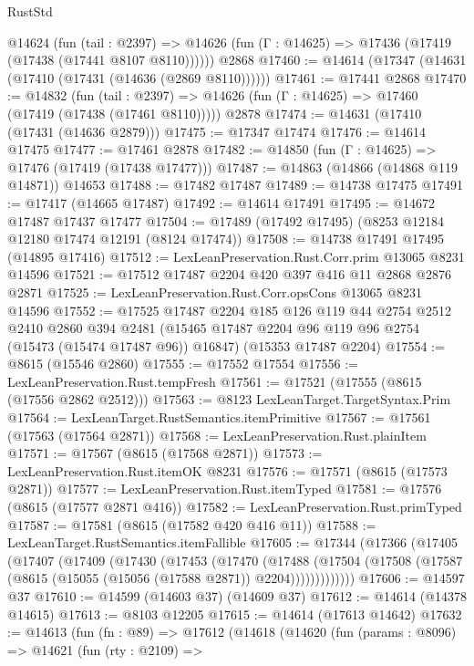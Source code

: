 \begin{lexlean}{RustStd}
\begin{coremodule}
    @14624
      (fun (tail : @2397) =>
      @14626 (fun (Γ : @14625) => @17436 (@17419 (@17438 (@17441 @8107 @8110))))))
    @2868
@17460 := @14614 (@17347 (@14631 (@17410 (@17431 (@14636 (@2869 @8110))))))
@17461 := @17441 @2868
@17470 := @14832
    (fun (tail : @2397) => @14626 (fun (Γ : @14625) => @17460 (@17419 (@17438 (@17461 @8110)))))
    @2878
@17474 := @14631 (@17410 (@17431 (@14636 @2879)))
@17475 := @17347 @17474
@17476 := @14614 @17475
@17477 := @17461 @2878
@17482 := @14850 (fun (Γ : @14625) => @17476 (@17419 (@17438 @17477)))
@17487 := @14863 (@14866 (@14868 @119 @14871)) @14653
@17488 := @17482 @17487
@17489 := @14738 @17475
@17491 := @17417 (@14665 @17487)
@17492 := @14614 @17491
@17495 := @14672 @17487 @17437 @17477
@17504 := @17489 (@17492 @17495) (@8253 @12184 @12180 @17474 @12191 (@8124 @17474))
@17508 := @14738 @17491 @17495 (@14895 @17416)
@17512 := LexLeanPreservation.Rust.Corr.prim @13065 @8231 @14596
@17521 := @17512 @17487 @2204 @420 @397 @416 @11 @2868 @2876 @2871
@17525 := LexLeanPreservation.Rust.Corr.opsCons @13065 @8231 @14596
@17552 := @17525
    @17487
    @2204
    @185
    @126
    @119
    @44
    @2754
    @2512
    @2410
    @2860
    @394
    @2481
    (@15465 @17487 @2204 @96 @119 @96 @2754 (@15473 (@15474 @17487 @96)) @16847)
    (@15353 @17487 @2204)
@17554 := @8615 (@15546 @2860)
@17555 := @17552 @17554
@17556 := LexLeanPreservation.Rust.tempFresh
@17561 := @17521 (@17555 (@8615 (@17556 @2862 @2512)))
@17563 := @8123 LexLeanTarget.TargetSyntax.Prim
@17564 := LexLeanTarget.RustSemantics.itemPrimitive
@17567 := @17561 (@17563 (@17564 @2871))
@17568 := LexLeanPreservation.Rust.plainItem
@17571 := @17567 (@8615 (@17568 @2871))
@17573 := LexLeanPreservation.Rust.itemOK @8231
@17576 := @17571 (@8615 (@17573 @2871))
@17577 := LexLeanPreservation.Rust.itemTyped
@17581 := @17576 (@8615 (@17577 @2871 @416))
@17582 := LexLeanPreservation.Rust.primTyped
@17587 := @17581 (@8615 (@17582 @420 @416 @11))
@17588 := LexLeanTarget.RustSemantics.itemFallible
@17605 := @17344
    (@17366
      (@17405
        (@17407
          (@17409
            (@17430
              (@17453
                (@17470
                  (@17488
                    (@17504
                      (@17508 (@17587 (@8615 (@15055 (@15056 (@17588 @2871)) @2204)))))))))))))
@17606 := @14597 @37
@17610 := @14599 (@14603 @37) (@14609 @37)
@17612 := @14614 (@14378 @14615)
@17613 := @8103 @12205
@17615 := @14614 (@17613 @14642)
@17632 := @14613
    (fun (fn : @89) =>
    @17612
      (@14618
        (@14620
          (fun (params : @8096) =>
          @14621
            (fun (rty : @2109) =>

\end{coremodule}
\end{lexlean}
